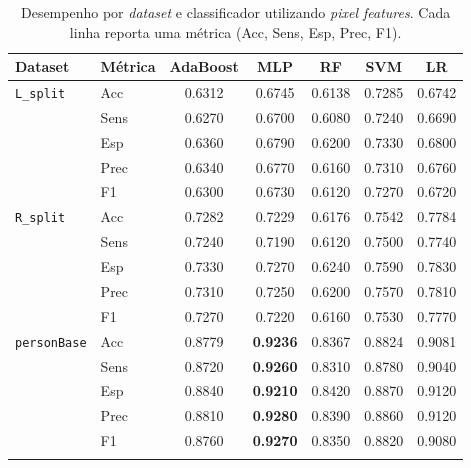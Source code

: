 \documentclass[12pt,a4paper]{article}
\begin{document}
\begin{table}[htbp]
\centering
\caption{Desempenho por \textit{dataset} e classificador utilizando \emph{pixel features}. Cada linha reporta uma métrica (Acc, Sens, Esp, Prec, F1).}
\label{tab:feat-metrics-dataset-classifier}
\small
\setlength{\tabcolsep}{4pt}
\renewcommand{\arraystretch}{1.08}
\begin{tabular}{llccccc}
\toprule
\textbf{Dataset} & \textbf{Métrica} & \textbf{AdaBoost} & \textbf{MLP} & \textbf{RF} & \textbf{SVM} & \textbf{LR} \\
\midrule
\texttt{L\_split} & Acc  & 0.6312 & 0.6745 & 0.6138 & 0.7285 & 0.6742 \\
                 & Sens & 0.6270 & 0.6700 & 0.6080 & 0.7240 & 0.6690 \\
                 & Esp  & 0.6360 & 0.6790 & 0.6200 & 0.7330 & 0.6800 \\
                 & Prec & 0.6340 & 0.6770 & 0.6160 & 0.7310 & 0.6760 \\
                 & F1   & 0.6300 & 0.6730 & 0.6120 & 0.7270 & 0.6720 \\
\addlinespace[5pt]
\texttt{R\_split} & Acc  & 0.7282 & 0.7229 & 0.6176 & 0.7542 & 0.7784 \\
                 & Sens & 0.7240 & 0.7190 & 0.6120 & 0.7500 & 0.7740 \\
                 & Esp  & 0.7330 & 0.7270 & 0.6240 & 0.7590 & 0.7830 \\
                 & Prec & 0.7310 & 0.7250 & 0.6200 & 0.7570 & 0.7810 \\
                 & F1   & 0.7270 & 0.7220 & 0.6160 & 0.7530 & 0.7770 \\
\addlinespace[5pt]
\texttt{personBase} & Acc  & 0.8779 & \textbf{0.9236} & 0.8367 & 0.8824 & 0.9081 \\
                   & Sens & 0.8720 & \textbf{0.9260} & 0.8310 & 0.8780 & 0.9040 \\
                   & Esp  & 0.8840 & \textbf{0.9210} & 0.8420 & 0.8870 & 0.9120 \\
                   & Prec & 0.8810 & \textbf{0.9280} & 0.8390 & 0.8860 & 0.9120 \\
                   & F1   & 0.8760 & \textbf{0.9270} & 0.8350 & 0.8820 & 0.9080 \\
\addlinespace[5pt]

\bottomrule
\end{tabular}
\end{table}
\end{document}
